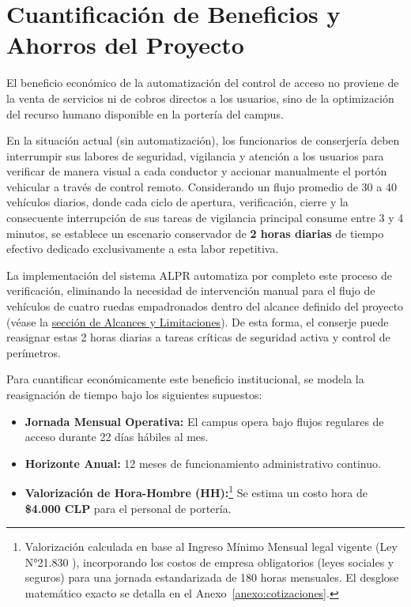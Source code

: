 \section{Cuantificación de Beneficios y Ahorros del Proyecto}
\label{sec:ahorros}

El beneficio económico de la automatización del control de acceso no proviene de la venta de servicios ni de cobros directos a los usuarios, sino de la optimización del recurso humano disponible en la portería del campus.

En la situación actual (sin automatización), los funcionarios de conserjería deben interrumpir sus labores de seguridad, vigilancia y atención a los usuarios para verificar de manera visual a cada conductor y accionar manualmente el portón vehicular a través de control remoto. Considerando un flujo promedio de 30 a 40 vehículos diarios, donde cada ciclo de apertura, verificación, cierre y la consecuente interrupción de sus tareas de vigilancia principal consume entre 3 y 4 minutos, se establece un escenario conservador de \textbf{2 horas diarias} de tiempo efectivo dedicado exclusivamente a esta labor repetitiva.

La implementación del sistema ALPR automatiza por completo este proceso de verificación, eliminando la necesidad de intervención manual para el flujo de vehículos de cuatro ruedas empadronados dentro del alcance definido del proyecto (véase la \hyperref[sec:alcances_limitaciones]{sección de Alcances y Limitaciones}). De esta forma, el conserje puede reasignar estas 2 horas diarias a tareas críticas de seguridad activa y control de perímetros.

Para cuantificar económicamente este beneficio institucional, se modela la reasignación de tiempo bajo los siguientes supuestos:
\begin{itemize}
    \item \textbf{Jornada Mensual Operativa:} El campus opera bajo flujos regulares de acceso durante 22 días hábiles al mes.
    \item \textbf{Horizonte Anual:} 12 meses de funcionamiento administrativo continuo.
    \item \textbf{Valorización de Hora-Hombre (HH):}\footnote{Valorización calculada en base al Ingreso Mínimo Mensual legal vigente (Ley N°21.830 \parencite{LeySueldoMinimo2026}), incorporando los costos de empresa obligatorios (leyes sociales y seguros) para una jornada estandarizada de 180 horas mensuales. El desglose matemático exacto se detalla en el Anexo~\ref{anexo:cotizaciones}.} Se estima un costo hora de \textbf{\$4.000 CLP} para el personal de portería.
\end{itemize}

